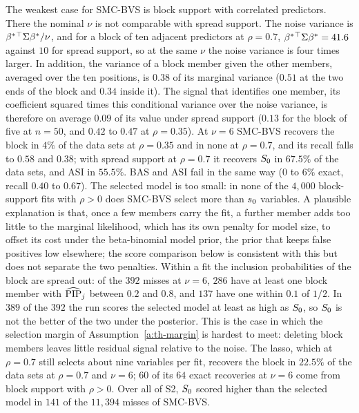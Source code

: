 The weakest case for SMC-BVS is block support with correlated predictors. There the nominal $\nu$ is not comparable
with spread support. The noise variance is $\beta^*{}^\top\Sigma\beta^*/\nu$, and for a block of ten adjacent
predictors at $\rho=0.7$, $\beta^*{}^\top\Sigma\beta^*=41.6$ against $10$ for spread support, so at the same $\nu$ the
noise variance is four times larger. In addition, the variance of a block member given the other members, averaged over the ten positions, is
$0.38$ of its marginal variance ($0.51$ at the two ends of the block and $0.34$ inside it). The signal that identifies
one member, its coefficient squared times this conditional variance over the noise variance, is therefore on average
$0.09$ of its value under spread support ($0.13$ for the block of five at
$n=50$, and $0.42$ to $0.47$ at $\rho=0.35$). At $\nu=6$ SMC-BVS recovers the block in $4\%$ of the data sets at
$\rho=0.35$ and in none at $\rho=0.7$, and its recall falls to $0.58$ and $0.38$; with spread support at $\rho=0.7$ it
recovers $S_0$ in $67.5\%$ of the data sets, and ASI in $55.5\%$. BAS and ASI fail in the same way ($0$ to $6\%$
exact, recall $0.40$ to $0.67$). The selected model is too small: in none of the $4{,}000$ block-support fits with
$\rho>0$ does SMC-BVS select more than $s_0$ variables. A plausible explanation is that, once a few members carry the
fit, a further member adds too little to the marginal likelihood, which has its own penalty for model size, to offset
its cost under the beta-binomial model prior, the prior that keeps false positives low elsewhere; the score comparison
below is consistent with this but does not separate the two penalties. Within a fit the inclusion probabilities of the block are spread out: of the
$392$ misses at $\nu=6$, $286$ have at least one block member with $\widehat{\mathrm{PIP}}_j$ between $0.2$ and $0.8$, and $137$ have
one within $0.1$ of $1/2$. In $389$ of the $392$ the run scores the selected model at least as high as $S_0$, so
$S_0$ is not the better of the two under the posterior. This is the case in which the selection margin of
Assumption~\ref{a:th-margin} is hardest to meet: deleting block members leaves little residual signal relative to the
noise. The lasso, which at $\rho=0.7$ still selects about nine variables per fit, recovers the block in $22.5\%$ of
the data sets at $\rho=0.7$ and $\nu=6$; $60$ of its $64$ exact recoveries at $\nu=6$ come from block support with
$\rho>0$. Over all of S2, $S_0$ scored higher than the selected model in $141$ of the $11{,}394$ misses of SMC-BVS.

